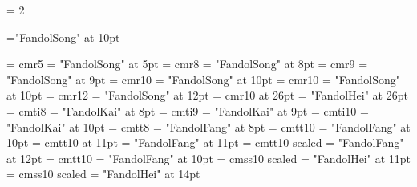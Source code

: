 %
\chardef\chinesefont = 2
\ifcase\chinesefont
  \def\song{Adobe Song Std}
  \def\hei{Adobe Heiti Std}
  \def\kai{Adobe Kaiti Std}
  \def\fang{Adobe Fangsong Std}
\or
  \def\song{SimSun}
  \def\hei{SimHei}
  \def\kai{KaiTi}
  \def\fang{FangSong}
\or
  \def\song{FandolSong}
  \def\hei{FandolHei}
  \def\kai{FandolKai}
  \def\fang{FandolFang}
\fi
%
\newif\ifxecjk \xecjktrue
\ifxecjk
  \font\CJKfont="\song" at 10pt
  
  \def\letfont{\let\CJKfont}
  \xeCJKenablechecksingle
  \normalspacedchars{-}
\else
  \font\zhfont="\song" at 10pt
  \def\zhpunctfont{\zhfont}
  
  \zhspacing
  \def\letfont{\let\zhfont}
\fi
%
\font\enfiverm = cmr5
\font\zhfiverm = "\song" at 5pt
\def\fiverm{\enfiverm\letfont\zhfiverm}
\font\eneightrm = cmr8
\font\zheightrm = "\song" at 8pt
\def\eightrm{\eneightrm\letfont\zheightrm}
\font\enninerm = cmr9 %
\font\zhninerm = "\song" at 9pt
\def\ninerm{\enninerm\letfont\zhninerm}
\font\entenrm = cmr10 %
\font\zhtenrm = "\song"  at 10pt
\def\tenrm{\entenrm\letfont\zhtenrm}
\font\enoldtenrm = cmr10 %
\font\zholdtenrm = "\song"  at 10pt
\def\oldtenrm{\enoldtenrm\letfont\zholdtenrm}
\font\entwelverm = cmr12
\font\zhtwelverm = "\song"  at 12pt
\def\twelverm{\entwelverm\letfont\zhtwelverm}
\font\entwentysixrm = cmr10 at 26pt
\font\zhtwentysixrm = "\hei"  at 26pt
\def\twentysixrm{\entwentysixrm\letfont\zhtwentysixrm}
%
\font\eneightit = cmti8
\font\zheightit = "\kai" at 8pt
\def\eightit{\eneightit\letfont\zheightit}
\font\ennineit = cmti9
\font\zheightit = "\kai" at 9pt
\def\nineit{\ennineit\letfont\zhnineit}
\font\entenit = cmti10
\font\zhtenit = "\kai" at 10pt
\def\tenit{\entenit\letfont\zhtenit}
%
\font\eneighttt = cmtt8
\font\zheighttt = "\fang" at 8pt
\def\eighttt{\eneighttt\letfont\zheighttt}
\font\ententt = cmtt10
\font\zhtentt = "\fang" at 10pt
\def\tentt{\ententt\letfont\zhtentt}
\font\eneleventt = cmtt10 at 11pt
\font\zheleventt = "\fang" at 11pt
\def\elventt{\enelventt\letfont\zhelventt}
\font\entwelvett = cmtt10 scaled 
\font\zhtwelvett = "\fang" at 12pt
\def\twelvett{\entwelvett\letfont\zhtwelvett}
%
\font\entenbt = cmtt10
\font\zhtenbt = "\fang" at 10pt
\def\tenbt{\entenbt\letfont\zhtenbt}
%
\font\enelevensf = cmss10 scaled\magstephalf
\font\zhelevensf = "\hei" at 11pt
\def\elevensf{\enelevensf\letfont\zhelevensf}
\font\enfourteensf = cmss10 scaled
\font\zhfourteensf = "\hei" at 14pt
\def\fourteensf{\enfourteensf\letfont\zhfourteensf}
